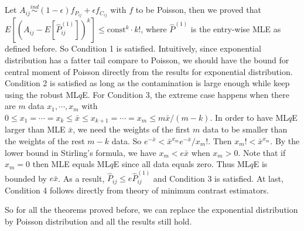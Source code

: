 \documentclass[simplex.tex]{subfiles}
\begin{document}
Let $A_{ij} \stackrel{ind}{\sim} (1-\epsilon) f_{P_{ij}} + \epsilon f_{C_{ij}}$ with $f$ to be Poisson, then we proved that $E[(A_{ij} - E[\hat{P}_{ij}^{(1)}])^k] \le \mathrm{const}^k \cdot k!$, where $\hat{P}^{(1)}$ is the entry-wise MLE as defined before.
So Condition 1 is satisfied. Intuitively, since exponential distribution has a fatter tail compare to Poisson, we should have the bound for central moment of Poisson directly from the results for exponential distribution.
Condition 2 is satisfied as long as the contamination is large enough while keep using the robust ML$q$E.
For Condition 3, the extreme case happens when there are $m$ data $x_1, \cdots, x_m$ with $0 \le x_1 = \cdots = x_k \le \bar{x} \le x_{k+1} = \cdots = x_m \le m \bar{x}/(m - k)$. In order to have ML$q$E larger than MLE $\bar{x}$, we need the weights of the first $m$ data to be smaller than the weights of the rest $m - k$ data. So $e^{-\bar{x}} < \bar{x}^{x_m} e^{-\bar{x}} / x_m!$. Then $x_m! < \bar{x}^{x_m}$. By the lower bound in Stirling's formula, we have $x_m < e \bar{x}$ when $x_m > 0$. Note that if $x_m = 0$ then MLE equals ML$q$E since all data equals zero. Thus ML$q$E is bounded by $e \bar{x}$. As a result, $\hat{P}_{ij} \le e \hat{P}_{ij}^{(1)}$ and Condition 3 is satisfied.
At last, Condition 4 follows directly from theory of minimum contrast estimators.

So for all the theorems proved before, we can replace the exponential distribution by Poisson distribution and all the results still hold.
\end{document}

